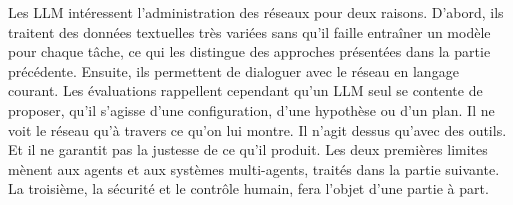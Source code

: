 Les LLM intéressent l'administration des réseaux pour deux raisons. D'abord, ils traitent des données textuelles très variées sans qu'il faille entraîner un modèle pour chaque tâche, ce qui les distingue des approches présentées dans la partie précédente. Ensuite, ils permettent de dialoguer avec le réseau en langage courant. Les évaluations rappellent cependant qu'un LLM seul se contente de proposer, qu'il s'agisse d'une configuration, d'une hypothèse ou d'un plan. Il ne voit le réseau qu'à travers ce qu'on lui montre. Il n'agit dessus qu'avec des outils. Et il ne garantit pas la justesse de ce qu'il produit. Les deux premières limites mènent aux agents et aux systèmes multi-agents, traités dans la partie suivante. La troisième, la sécurité et le contrôle humain, fera l'objet d'une partie à part.
